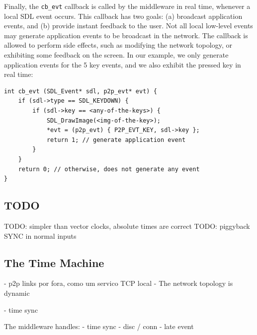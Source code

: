 \documentclass[10pt,journal,compsoc]{IEEEtran}
\newcommand{\code}[1]  {\texttt{\footnotesize{#1}}}
\begin{document}
Finally, the \code{cb\_evt} callback is called by the middleware in real time,
whenever a local SDL event occurs.
This callback has two goals:
    (a) broadcast application events, and
    (b) provide instant feedback to the user.
Not all local low-level events may generate application events to be broadcast
in the network.
The callback is allowed to perform side effects, such as modifying the network
topology, or exhibiting some feedback on the screen.
In our example, we only generate application events for the 5 key events, and
we also exhibit the pressed key in real time:

{\footnotesize
\begin{verbatim}
int cb_evt (SDL_Event* sdl, p2p_evt* evt) {
    if (sdl->type == SDL_KEYDOWN) {
        if (sdl->key == <any-of-the-keys>) {
            SDL_DrawImage(<img-of-the-key>);
            *evt = (p2p_evt) { P2P_EVT_KEY, sdl->key };
            return 1; // generate application event
        }
    }
    return 0; // otherwise, does not generate any event
}
\end{verbatim}
}

\subsection{TODO}

TODO: simpler than vector clocks, absolute times are correct
TODO: piggyback SYNC in normal inputs

\subsection{The Time Machine}
\label{sec.tml.time}


- p2p links por fora, como um servico TCP local
- The network topology is dynamic


%
- time sync

The middleware handles:
- time sync
- disc / conn
- late event
\end{document}
